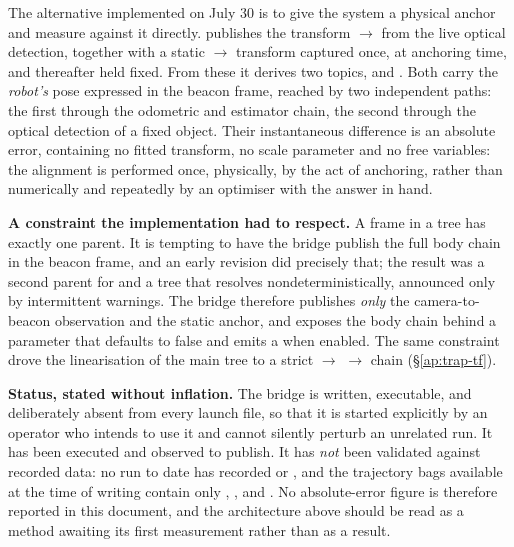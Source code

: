 The alternative implemented on July 30 is to give the system a physical
anchor and measure against it directly.
 publishes
the transform  $\to$  from the live
optical detection, together with a static  $\to$
 transform captured once, at anchoring time, and thereafter held
fixed. From these it derives two topics,  and
. Both carry the \emph{robot's} pose expressed in
the beacon frame, reached by two independent paths: the first through the
odometric and estimator chain, the second through the optical detection of a
fixed object. Their instantaneous difference is an absolute error, containing
no fitted transform, no scale parameter and no free variables: the
alignment is performed once, physically, by the act of anchoring, rather than
numerically and repeatedly by an optimiser with the answer in hand.

\noindent\textbf{A constraint the implementation had to respect.} A frame in
a  tree has exactly one parent. It is tempting to have the bridge
publish the full body chain in the beacon frame, and an early revision did
precisely that; the result was a second parent for  and a
tree that  resolves nondeterministically, announced only by
intermittent  warnings. The bridge therefore publishes
\emph{only} the camera-to-beacon observation and the static anchor, and
exposes the body chain behind a 
parameter that defaults to false and emits a  when enabled. The
same constraint drove the linearisation of the main tree to a strict
 $\to$  $\to$  chain
(\S\ref{ap:trap-tf}).

\noindent\textbf{Status, stated without inflation.} The bridge is written,
executable, and deliberately absent from every launch file, so that it is
started explicitly by an operator who intends to use it and cannot silently
perturb an unrelated run. It has been executed and observed to publish. It
has \emph{not} been validated against recorded data: no run to date has
recorded  or , and the
trajectory bags available at the time of writing contain only
, , 
and . No absolute-error figure is therefore
reported in this document, and the architecture above should be read as a
method awaiting its first measurement rather than as a result.

